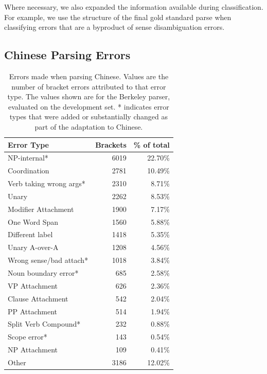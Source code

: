 Where necessary, we also expanded the information available during
classification.  For example, we use the structure of the final gold standard
parse when classifying errors that are a byproduct of sense disambiguation
errors.

\subsection{Chinese Parsing Errors} \label{sec:chinese_parsing_errors}

\begin{table}
\centering
\begin{tabular}{lrr}
  \hline
  Error Type & Brackets & \% of total \\
  \hline
  \hline
              NP-internal* & 6019 & 22.70\% \\
              Coordination & 2781 & 10.49\% \\
   Verb taking wrong args* & 2310 &  8.71\% \\
                     Unary & 2262 &  8.53\% \\
       Modifier Attachment & 1900 &  7.17\% \\
             One Word Span & 1560 &  5.88\% \\
           Different label & 1418 &  5.35\% \\
            Unary A-over-A & 1208 &  4.56\% \\
   Wrong sense/bad attach* & 1018 &  3.84\% \\
      Noun boundary error* &  685 &  2.58\% \\
             VP Attachment &  626 &  2.36\% \\
         Clause Attachment &  542 &  2.04\% \\
             PP Attachment &  514 &  1.94\% \\
      Split Verb Compound* &  232 &  0.88\% \\
              Scope error* &  143 &  0.54\% \\
             NP Attachment &  109 &  0.41\% \\
                     Other & 3186 & 12.02\% \\
\hline
\end{tabular}
\caption[Breakdown of errors in Chinese parsing.]{ \label{tab:errors} 
  Errors made when parsing Chinese. Values are the number of bracket errors
  attributed to that error type. The values shown are for the Berkeley parser,
  evaluated on the development set. * indicates error types that were added or
  substantially changed as part of the adaptation to Chinese.
}
\end{table}

